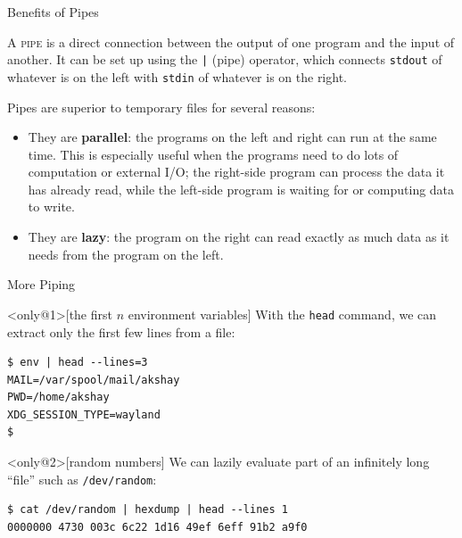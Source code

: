 \begin{frame}{Benefits of Pipes}
  \begin{definition}[pipe]
    A \textsc{pipe} is a direct connection between the output of one program
    and the input of another.  It can be set up using the \texttt{|} (pipe)
    operator, which connects \texttt{stdout} of whatever is on the left with
    \texttt{stdin} of whatever is on the right.
  \end{definition}
  \pause
  Pipes are superior to temporary files for several reasons:
  \pause
  \begin{itemize}
    \item
      They are \textbf{parallel}: the programs on the left and right can run at
      the same time.
       {
        This is especially useful when the programs need to do lots of
        computation or external I/O; the right-side program can process the
        data it has already read, while the left-side program is waiting for or
        computing data to write.
      }
      \pause
    \item
      They are \textbf{lazy}: the program on the right can read exactly as much data as it needs from the program on the left.
  \end{itemize}
\end{frame}

\begin{frame}[c,fragile]{More Piping}
  \begin{example}<only@1>[the first $n$ environment variables]
    With the \texttt{head} command, we can extract only the first few lines
    from a file:
    \begin{verbatim}
$ env | head --lines=3
MAIL=/var/spool/mail/akshay
PWD=/home/akshay
XDG_SESSION_TYPE=wayland
$
    \end{verbatim}
  \end{example}

  \pause
  \begin{example}<only@2>[random numbers]
    We can lazily evaluate part of an infinitely long \enquote{file} such as
    \texttt{/dev/random}:
    \begin{verbatim}
$ cat /dev/random | hexdump | head --lines 1
0000000 4730 003c 6c22 1d16 49ef 6eff 91b2 a9f0
    \end{verbatim}
  \end{example}
\end{frame}

